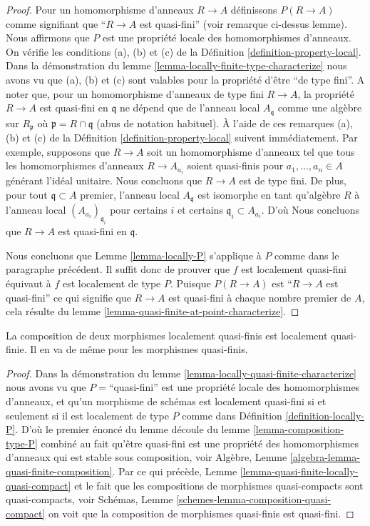 \begin{proof}
Pour un homomorphisme d'anneaux $R \to A$
définissons $P(R \to A)$ comme signifiant que ``$R \to A$
est quasi-fini''
(voir remarque ci-dessus lemme). Nous affirmons
que $P$ est une propriété locale des homomorphismes
d'anneaux. On vérifie les conditions (a), (b) et
(c) de la Définition \ref{definition-property-local}. Dans la démonstration
du lemme \ref{lemma-locally-finite-type-characterize} nous avons vu que (a), (b) et (c) sont
valables pour la propriété d'être ``de type fini''. A noter
que, pour un homomorphisme d'anneaux de type fini $R \to A$, la propriété
$R \to A$ est quasi-fini en $\mathfrak q$ ne dépend que
de l'anneau local $A_{\mathfrak q}$ comme une algèbre sur $R_{\mathfrak p}$ où $\mathfrak p = R \cap \mathfrak q$
(abus de notation habituel). À l'aide de ces remarques (a), (b) et
(c) de la Définition \ref{definition-property-local} suivent immédiatement. Par exemple,
supposons que $R \to A$ soit un homomorphisme
d'anneaux tel que tous les homomorphismes d'anneaux $R \to A_{a_i}$
soient quasi-finis pour $a_1, \ldots, a_n \in A$ générant l'idéal
unitaire. Nous concluons que $R \to A$ est de type
fini. De plus, pour tout $\mathfrak q \subset A$ premier, l'anneau local $A_{\mathfrak q}$
est isomorphe en tant qu'algèbre $R$
à l'anneau local $(A_{a_i})_{\mathfrak q_i}$ pour certains $i$
et certains $\mathfrak q_i \subset A_{a_i}$. D'où Nous concluons que
$R \to A$ est quasi-fini en $\mathfrak q$.

\medskip\noindent Nous
concluons que Lemme \ref{lemma-locally-P} s'applique à $P$ comme dans
le paragraphe précédent. Il
suffit donc de prouver que $f$ est localement quasi-fini équivaut
à $f$ est localement de type $P$. Puisque $P(R \to A)$
est ``$R \to A$ est quasi-fini'' ce qui
signifie que $R \to A$ est quasi-fini à chaque nombre
premier de $A$, cela résulte du lemme \ref{lemma-quasi-finite-at-point-characterize}.
\end{proof}

\begin{lemma}
\label{lemma-composition-quasi-finite}
La composition de deux morphismes localement quasi-finis est localement
quasi-finie. Il en va de même pour les morphismes quasi-finis.
\end{lemma}

\begin{proof}
Dans la démonstration du lemme \ref{lemma-locally-quasi-finite-characterize} nous avons vu que $P = $``quasi-fini''
est une propriété locale des
homomorphismes d'anneaux, et qu'un morphisme de schémas est localement
quasi-fini si et seulement si il est localement de type
$P$ comme dans Définition \ref{definition-locally-P}. D'où
le premier énoncé du lemme découle du lemme
\ref{lemma-composition-type-P} combiné au fait qu'être quasi-fini est une propriété
des homomorphismes d'anneaux
qui est stable sous composition, voir Algèbre, Lemme \ref{algebra-lemma-quasi-finite-composition}.
Par ce qui précède, Lemme \ref{lemma-quasi-finite-locally-quasi-compact} et le fait que
les compositions de morphismes
quasi-compacts sont quasi-compacts, voir
Schémas, Lemme \ref{schemes-lemma-composition-quasi-compact} on voit que la composition
de morphismes quasi-finis est
quasi-fini.
\end{proof}

